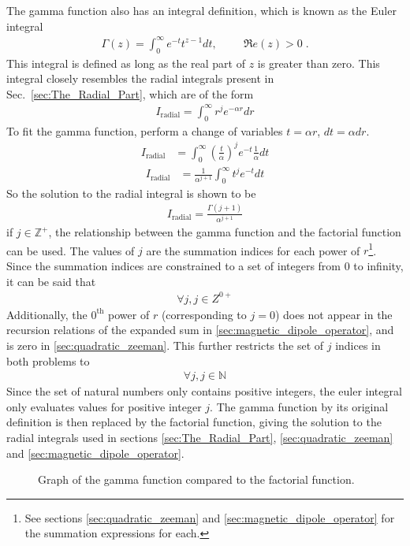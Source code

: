         The gamma function also has an integral definition, which is known as the Euler integral
        \begin{align}
            \Gamma(z) = \int_0^\infty e^{-t} t^{z-1} dt, \hspace{1cm} \mathfrak{R}e(z) > 0\;.
        \end{align}
        \noindent This integral is defined as long as the real part of $z$ is greater than zero. This integral closely resembles the radial integrals present in Sec.~\ref{sec:The_Radial_Part}, which are of the form
        \begin{align}
            I_{\text{radial}} = \int_0^\infty r^j e^{-\alpha r} dr
        \end{align}
        \noindent To fit the gamma function, perform a change of variables $t = \alpha r$, $dt = \alpha dr$.
        \begin{align}
            I_{\text{radial}} &= \int_0^\infty \left( \frac{t}{\alpha} \right)^j e^{-t} \frac{1}{\alpha} dt
        \end{align}
        \begin{align}
            I_{\text{radial}} &= \frac{1}{\alpha^{j+1}}\int_0^\infty {t}^j e^{-t} dt
        \end{align}
        \noindent So the solution to the radial integral is shown to be 
        \begin{align}
            I_{\text{radial}} = \frac{\Gamma(j+1)}{\alpha^{j+1}}
        \end{align}
        \noindent if $j \in \mathbb{Z}^+$, the relationship between the gamma function and the factorial function can be used. The values of $j$ are the summation indices for each power of $r$\footnote{See sections \ref{sec:quadratic_zeeman} and \ref{sec:magnetic_dipole_operator} for the summation expressions for each.}. Since the summation indices are constrained to a set of integers from 0 to infinity, it can be said that 
        \begin{align}
            \forall j, j \in Z^{0+}
        \end{align}
        \noindent Additionally, the $0^{\text{th}}$ power of $r$ (corresponding to $j = 0$) does not appear in the recursion relations of the expanded sum in \ref{sec:magnetic_dipole_operator}, and is zero in \ref{sec:quadratic_zeeman}. This further restricts the set of $j$ indices in both problems to 
        \begin{align}
            \forall j, j\in \mathbb{N}
        \end{align}
        \noindent Since the set of natural numbers only contains positive integers, the euler integral only evaluates values for positive integer $j$. The gamma function by its original definition is then replaced by the factorial function, giving the solution to the radial integrals used in sections \ref{sec:The_Radial_Part}, \ref{sec:quadratic_zeeman} and \ref{sec:magnetic_dipole_operator}. 
        \begin{figure}[ht!]
            \centering
            \resizebox{0.8\linewidth}{!}{}
            \caption{Graph of the gamma function compared to the factorial function.}
            \label{img:Gamma_fn_graph}
        \end{figure}
